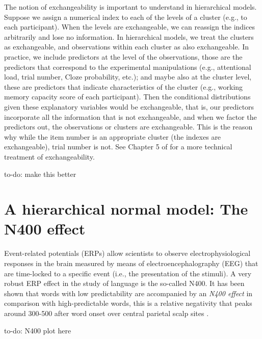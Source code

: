 \documentclass[12pt,]{krantz}
\theoremstyle{definition}
\theoremstyle{definition}
\theoremstyle{definition}
\theoremstyle{remark}
\let\BeginKnitrBlock\begin \let\EndKnitrBlock\end
\begin{document}
The notion of exchangeability is important to understand in hierarchical models. Suppose we assign a numerical index to each of the levels of a cluster (e.g., to each participant). When the levels are exchangeable, we can reassign the indices arbitrarily and lose no information. In hierarchical models, we treat the clusters as exchangeable, and observations within each cluster as also exchangeable. In practice, we include predictors at the level of the observations, those are the predictors that correspond to the experimental manipulations (e.g., attentional load, trial number, Cloze probability, etc.); and maybe also at the cluster level, these are predictors that indicate characteristics of the cluster (e.g., working memory capacity score of each participant). Then the conditional distributions given these explanatory variables would be exchangeable, that is, our predictors incorporate all the information that is not exchangeable, and when we factor the predictors out, the observations or clusters are exchangeable. This is the reason why while the item number is an appropriate cluster (the indexes are exchangeable), trial number is not. See Chapter 5 of \citet{Gelman14} for a more technical treatment of exchangeability.

\BeginKnitrBlock{rmdnote}
to-do: make this better
\EndKnitrBlock{rmdnote}

\hypertarget{a-hierarchical-normal-model-the-n400-effect}{%
\section{A hierarchical normal model: The N400 effect}\label{a-hierarchical-normal-model-the-n400-effect}}

Event-related potentials (ERPs) allow scientists to observe electrophysiological responses in the brain measured by means of electroencephalography (EEG) that are time-locked to a specific event (i.e., the presentation of the stimuli). A very robust ERP effect in the study of language is the so-called N400. It has been shown that words with low predictability are accompanied by an \emph{N400 effect} in comparison with high-predictable words, this is a relative negativity that peaks around 300-500 after word onset over central parietal scalp sites \citetext{\citealp[first noticed in][]{kutasReadingSenselessSentences1980}; \citealp[for semantic anomalies and in][ for low predictable word]{kutasBrainPotentialsReading1984}; \citealp[for a review:][]{kutasThirtyYearsCounting2011}}.

\BeginKnitrBlock{rmdnote}
to-do: N400 plot here
\EndKnitrBlock{rmdnote}
\end{document}

